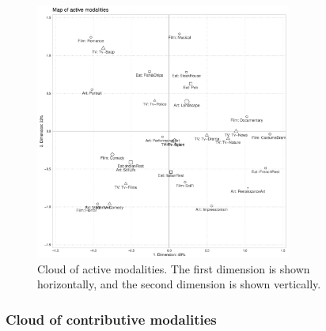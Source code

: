 \documentclass[
  letterpaper,
  DIV=11,
  numbers=noendperiod]{scrartcl}
\begin{document}
\begin{figure}[H]

{\centering \includegraphics[width=0.75\textwidth,height=\textheight]{ctrl+R_files/figure-pdf/unnamed-chunk-9-1.pdf}

}

\caption{Cloud of active modalities. The first dimension is shown
horizontally, and the second dimension is shown vertically.}

\end{figure}%

\normalsize

\subsubsection{Cloud of contributive
modalities}\label{cloud-of-contributive-modalities}

\scriptsize
\end{document}
